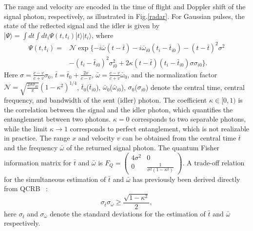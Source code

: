 \documentclass[
aps,
prl,
twocolumn,

superscriptaddress]{revtex4-2}
\newcommand{\ket}[1]{|#1\rangle}
\begin{document}
The range and velocity are encoded in the time of flight and Doppler shift of the signal photon, respectively, as illustrated in Fig.\ref{radar}. For Gaussian pulses, the state of the reflected signal and the idler is given by~\cite{huang2021,pra} $\ket{\Psi} = \int dt \int dt_i \Psi(t,t_i) \ket{t} \ket{t_i}$,
where
\begin{equation}
 \begin{aligned}
     \Psi(t,t_i) = &\mathcal{N} \exp\{-i \bar{\omega}(t-\bar{t})-i\bar{\omega}_{i0}(t_i-\bar{t}_{i0})-(t-\bar{t})^2 \sigma^2 \\&- (t_i-\bar{t}_{i0})^2 \sigma_{i0}^2 + 2 \kappa (t-\bar{t})(t_i-\bar{t}_{i0})\sigma\sigma_{i0}\}.
 \end{aligned}
\end{equation}
Here $\sigma = \frac{c-v}{c+v} \sigma_0$, $\bar{t} = \bar{t}_0 + \frac{2x}{c-v}$, $\bar{\omega} = \frac{c-v}{c+v} \bar{\omega}_0$, and the normalization factor $\mathcal{N} = \sqrt{\frac{2\sigma \sigma_{i0}}{\pi}}(1-\kappa^2)^{1/4}$, $\bar{t}_0$($\bar{t}_{i0}$), $\bar{\omega}_0$($\bar{\omega}_{i0}$), $\sigma_0$($\sigma_{i0}$) denote the central time, central frequency, and bandwidth of the sent (idler) photon. The coefficient $\kappa \in [0,1)$ is the correlation between the signal and the idler photon, which quantifies the entanglement between two photons.
$\kappa=0$ corresponds to two separable photons, while the limit $\kappa \to 1$ corresponds to perfect entanglement, which is not realizable in practice.
The range $x$ and velocity $v$ can be obtained from the central time $\bar{t}$ and the frequency $\bar{\omega}$ of the returned signal photon. The quantum Fisher information matrix for $\bar{t}$ and $\bar{\omega}$ is $F_Q = \left(\begin{matrix}
    4 \sigma^2 & 0 \\ 0 & \frac{1}{\sigma^2(1-\kappa^2)}
  \end{matrix}\right)$.
A trade-off relation for the simultaneous estimation of $\bar{t}$ and $\bar{\omega}$ has previously been derived directly from QCRB ~\cite{huang2021}:
\begin{equation}\label{eq:boundqcrb}
\sigma_{\bar{t}}\sigma_{\bar{\omega}} \geq \frac{\sqrt{1-\kappa^2}}{2},
\end{equation}
here $\sigma_{\bar{t}}$ and $\sigma_{\bar{\omega}}$ denote the standard deviations for the estimation of $\bar{t}$ and $\bar{\omega}$ respectively.
\end{document}
